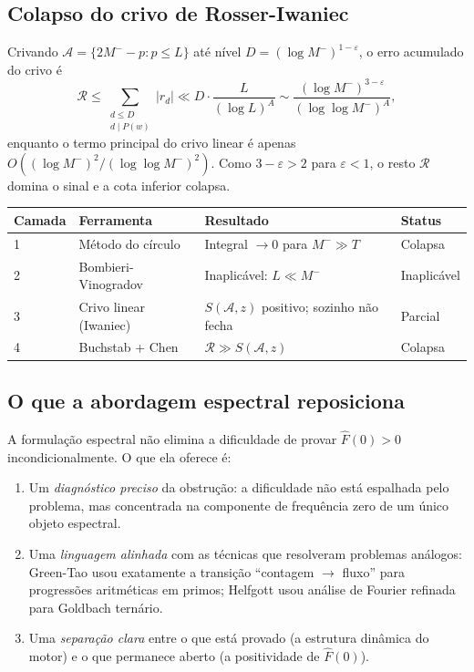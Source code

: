 \documentclass[12pt,a4paper]{article}
\theoremstyle{definition}
\begin{document}
	\subsection{Colapso do crivo de Rosser-Iwaniec}
	
	Crivando $\mathcal{A} = \{2M^- - p : p \leq L\}$ até nível
	$D = (\log M^-)^{1-\varepsilon}$, o erro acumulado do crivo é
	\[
	\mathcal{R} \leq \sum_{\substack{d \leq D \\ d \mid P(w)}} |r_d|
	\ll D \cdot \frac{L}{(\log L)^A}
	\sim \frac{(\log M^-)^{3-\varepsilon}}{(\log\log M^-)^A},
	\]
	enquanto o termo principal do crivo linear é apenas
	$O((\log M^-)^2/(\log\log M^-)^2)$. Como $3 - \varepsilon > 2$ para
	$\varepsilon < 1$, o resto $\mathcal{R}$ domina o sinal e a cota
	inferior colapsa.
	
	\begin{center}
		\renewcommand{\arraystretch}{1.4}
		\begin{tabular}{llll}
			\toprule
			\textbf{Camada} & \textbf{Ferramenta} & \textbf{Resultado} & \textbf{Status} \\
			\midrule
			1 & Método do círculo & Integral $\to 0$ para $M^- \gg T$ & Colapsa \\
			2 & Bombieri-Vinogradov & Inaplicável: $L \ll M^-$ & Inaplicável \\
			3 & Crivo linear (Iwaniec) & $S(\mathcal{A},z)$ positivo; sozinho não fecha & Parcial \\
			4 & Buchstab + Chen & $\mathcal{R} \gg S(\mathcal{A},z)$ & Colapsa \\
			\bottomrule
		\end{tabular}
	\end{center}
	
	\subsection{O que a abordagem espectral reposiciona}
	
	A formulação espectral não elimina a dificuldade de provar
	$\widehat{F}(0) > 0$ incondicionalmente. O que ela oferece é:
	\begin{enumerate}[label=(\alph*)]
		\item Um \emph{diagnóstico preciso} da obstrução: a dificuldade não
		está espalhada pelo problema, mas concentrada na componente de frequência
		zero de um único objeto espectral.
		\item Uma \emph{linguagem alinhada} com as técnicas que resolveram
		problemas análogos: Green-Tao usou exatamente a transição
		``contagem $\to$ fluxo'' para progressões aritméticas em primos;
		Helfgott \cite{helfgott} usou análise de Fourier refinada para
		Goldbach ternário.
		\item Uma \emph{separação clara} entre o que está provado (a estrutura
		dinâmica do motor) e o que permanece aberto (a positividade de
		$\widehat{F}(0)$).
	\end{enumerate}
	
\end{document}
